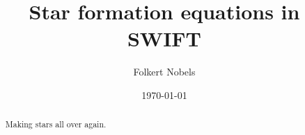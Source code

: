 \documentclass[fleqn, usenatbib, useAMS, a4paper]{mnras}
\title{Star formation equations in SWIFT}
\author{Folkert Nobels}
\begin{document}
\date{\today}

\pagerange{\pageref{firstpage}--\pageref{lastpage}} 

\maketitle

\label{firstpage}

\begin{abstract}
Making stars all over again.
\end{abstract}

\begin{keywords}
\end{keywords}









\label{lastpage}
\end{document}
